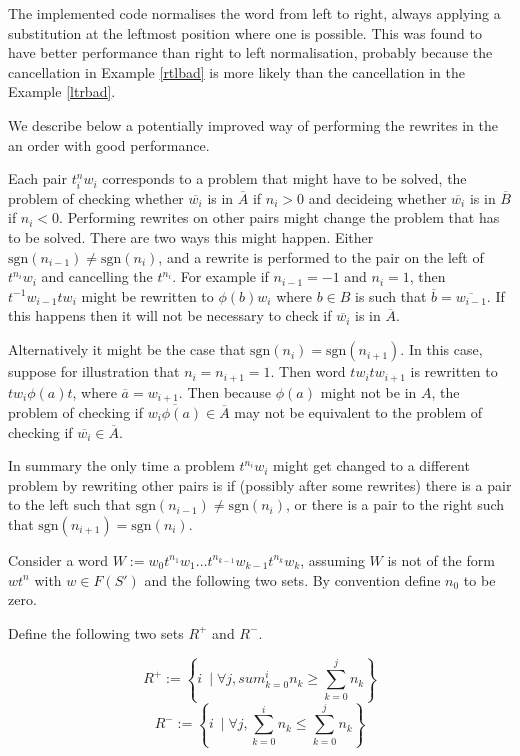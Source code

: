\documentclass[12pt]{article} %
\theoremstyle{definition}
\theoremstyle{definition}
\theoremstyle{definition}
\theoremstyle{definition}
\theoremstyle{definition}
\theoremstyle{definition}
\begin{document}
The implemented code normalises the word from left to right, always applying
a substitution at the leftmost position where one is possible. This was found to have better
performance than right to left normalisation, probably because the cancellation
in Example \ref{rtlbad} is more likely than the cancellation in the Example \ref{ltrbad}.

We describe below a potentially improved way of performing the rewrites in the
an order with good performance.

Each pair $t^n_iw_i$ corresponds to a problem that might have to be solved, the problem
of checking whether $\overline{w_i}$ is in $\overline{A}$ if $n_i > 0$ and decideing whether
$\overline{w_i}$ is in $\overline{B}$ if $n_i < 0$. Performing rewrites on other pairs
might change the problem that has to be solved. There are two ways this might happen.
Either $\text{sgn}(n_{i-1}) \ne \text{sgn}(n_i)$, and a rewrite is performed
to the pair on the left of $t^{n_i} w_i$ and cancelling the $t^{n_i}$. For example
if $n_{i-1} = -1$ and $n_i = 1$, then $t^{-1}w_{i-1}tw_i$ might be rewritten
to $\phi(b)w_i$ where $b \in B$ is such that $\overline{b} = \overline{w_{i-1}}$.
If this happens then it will not be necessary to check if $\overline{w_i}$ is in
$\overline{A}$.

Alternatively it might be the case that $\text{sgn}(n_i) = \text{sgn}(n_{i+1})$. In this case,
suppose for illustration that $n_i = n_{i+1} = 1$. Then word $tw_itw_{i+1}$ is rewritten
to $tw_i\phi(a)t$, where $\overline{a} = w_{i+1}$. Then because $\phi(a)$ might not be in $A$,
the problem of checking if $\overline{w_i\phi(a)} \in \overline{A}$ may not be equivalent
to the problem of checking if $\overline{w_i} \in \overline{A}$.

In summary the only time a problem $t^{n_i}w_i$ might get changed to a different problem
by rewriting other pairs is if (possibly after some rewrites) there
is a pair to the left such that $\text{sgn}(n_{i-1}) \ne \text{sgn}(n_i)$,
or there is a pair to the right such that $\text{sgn}(n_{i+1}) = \text{sgn}(n_i)$.


Consider a word $W := w_0t^{n_1}w_1 \dots t^{n_{k-1}}w_{k-1}t^{n_k}w_k$, assuming
$W$ is not of the form $wt^n$ with $w \in F(S')$ and the
following two sets. By convention define $n_0$ to be zero.

Define the following two sets $R^+$ and $R^-$.

\begin{equation}
    R^{+} := \left\{ i \ \mid \forall j, sum_{k=0}^i n_k \ge \sum_{k=0}^j n_k\right\}
\end{equation}
\begin{equation}
    R^{-} := \left\{ i \ \mid \forall j, \sum_{k=0}^i n_k \le \sum_{k=0}^j n_k \right\}
\end{equation}
\end{document}
